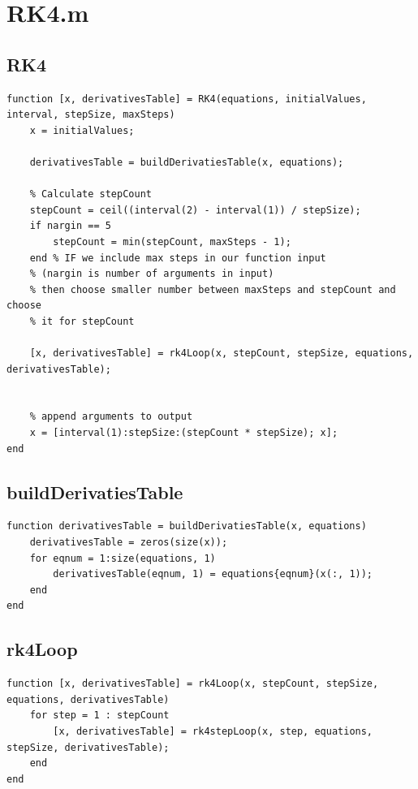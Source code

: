 \section{RK4.m}
\subsection{RK4}
\begin{simplechar}
\begin{lstlisting}
function [x, derivativesTable] = RK4(equations, initialValues, interval, stepSize, maxSteps)
    x = initialValues;

    derivativesTable = buildDerivatiesTable(x, equations);

    % Calculate stepCount
    stepCount = ceil((interval(2) - interval(1)) / stepSize);
    if nargin == 5
        stepCount = min(stepCount, maxSteps - 1);
    end % IF we include max steps in our function input
    % (nargin is number of arguments in input)
    % then choose smaller number between maxSteps and stepCount and choose
    % it for stepCount

    [x, derivativesTable] = rk4Loop(x, stepCount, stepSize, equations, derivativesTable);


    % append arguments to output
    x = [interval(1):stepSize:(stepCount * stepSize); x];
end
\end{lstlisting}
\end{simplechar}

\subsection{buildDerivatiesTable}
\begin{simplechar}
\begin{lstlisting}
function derivativesTable = buildDerivatiesTable(x, equations)
    derivativesTable = zeros(size(x));
    for eqnum = 1:size(equations, 1)
        derivativesTable(eqnum, 1) = equations{eqnum}(x(:, 1));
    end
end
\end{lstlisting}
\end{simplechar}

\subsection{rk4Loop}
\begin{simplechar}
\begin{lstlisting}
function [x, derivativesTable] = rk4Loop(x, stepCount, stepSize, equations, derivativesTable)
    for step = 1 : stepCount
        [x, derivativesTable] = rk4stepLoop(x, step, equations, stepSize, derivativesTable);
    end
end
\end{lstlisting}
\end{simplechar}

